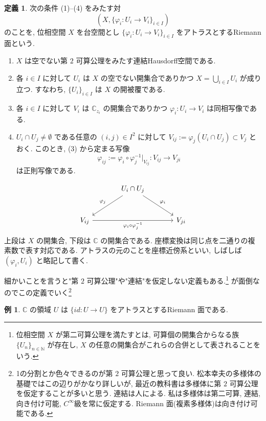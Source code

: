 \documentclass[dvipdfmx,a4paper,11pt]{article} %
\newcommand{\C}{\mathbb{C}}
\theoremstyle{definition}
\numberwithin{equation}{section}
\newtheorem{dfn}[thm]{定義}
\newtheorem{exa}[thm]{例}
\begin{document}
\begin{dfn}\label{O-M035}
次の条件 (1)--(4) をみたす対
\[
\left(X,\{\varphi_i:U_i\to V_i\}_{i\in I}\right)
\]
のことを, 位相空間 $X$ を台空間とし $\{\varphi_i:U_i\to V_i\}_{i\in I}$ をアトラスとするRiemann 面という.
\begin{enumerate}
\item
$X$ は空でない第 $2$ 可算公理をみたす連結Hausdorff空間である.
\item
各 $i\in I$ に対して $U_i$ は $X$ の空でない開集合でありかつ $X=\bigcup_{i\in I}U_i$ が成り立つ. すなわち, $\{U_i\}_{i\in I}$ は $X$ の開被覆である.
\item
各 $i\in I$ に対して $V_i$ は $\C{}_{z_i}$ の開集合でありかつ $\varphi_i:U_i\to V_i$ は同相写像である.
\item
$U_i\cap U_j\neq \emptyset$ である任意の $(i,j)\in I^2$ に対して $V_{ij}:=\varphi_j(U_i\cap U_j)\subset V_j$ とおく. このとき, (3) から定まる写像
\[
\varphi_{ij}:=\varphi_i\circ \varphi_j^{-1}|_{V_{ij}}:V_{ij}\to V_{ji}
\]
は正則写像である.
\end{enumerate}
\[
\begin{tikzcd}[column sep=large,row sep=large]
& U_i\cap U_j \arrow[dl,"\varphi_j"'] \arrow[dr,"\varphi_i"] &\\
V_{ij} \arrow[rr,"\varphi_i\circ\varphi_j^{-1}"'] && V_{ji}
\end{tikzcd}
\]
上段は $X$ の開集合, 下段は $\C$ の開集合である.
座標変換は同じ点を二通りの複素数で表す対応である.
アトラスの元のことを座標近傍系といい, しばしば $(\varphi_i,U_i)$ と略記して書く.

\end{dfn}
細かいことを言うと"第 $2$ 可算公理"や"連結"を仮定しない定義もある.\footnote{位相空間 $X$ が第二可算公理を満たすとは, 可算個の開集合からなる族 $\{U_n\}_{n\in\mathbb N}$ が存在し, 
$X$ の任意の開集合がこれらの合併として表されることをいう.}
が面倒なのでこの定義でいく\footnote{1の分割とか色々できるのが第 $2$ 可算公理と思って良い. 松本幸夫の多様体の基礎ではこの辺りがかなり詳しいが, 最近の教科書は多様体に第 $2$ 可算公理を仮定することが多いと思う. 連結は人による. 私は多様体は第二可算, 連結, 向き付け可能, $C^\infty$級を常に仮定する. Riemann 面(複素多様体)は向き付け可能である. }

\begin{exa}\label{O-M036}
$\C{}$ の領域 $U$ は $\{id:U\to U\}$ をアトラスとするRiemann 面である.
\end{exa}
\end{document}
